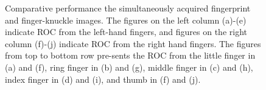 \begin{figure}
    \caption{Comparative performance the simultaneously acquired fingerprint and finger-knuckle images. The figures on the left column (a)-(e) indicate ROC from the left-hand fingers, and figures on the right column (f)-(j) indicate ROC from the right hand fingers. The figures from top to bottom row pre-sents the ROC from the little finger in (a) and (f), ring finger in (b) and (g), middle finger in (c) and (h), index finger in (d) and (i), and thumb in (f) and (j).}
    \label{joint-performance}
\end{figure}

